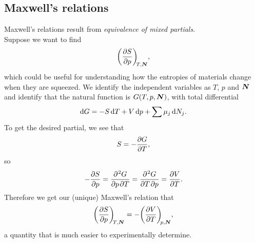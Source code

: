 \subsection{Maxwell's relations}
Maxwell's relations result from \textit{equivalence of mixed partials}. \\
Suppose we want to find 
\begin{equation}
\diffp Sp[T,\bvec{N}],
\end{equation}
which could be useful for understanding how the entropies of materials change when they are squeezed. 
We identify the independent variables as $T$, $p$ and $\boldsymbol{N}$ 
and identify that the natural function is $G(T,p,\boldsymbol{N})$, with total differential
\begin{equation}
\dif G=-S\dif T+V\dif p+\sum\mu_j\dif N_j.
\end{equation}
To get the desired partial, we see that
\begin{equation}
S=-\diffp GT,
\end{equation}
so
\begin{equation}
-\diffp Sp=\diffp{G}{p,T}=\diffp{G}{T,p}=\diffp VT.
\end{equation}
Therefore we get our (unique) Maxwell's relation that
\begin{equation}
\diffp Sp[T,\bvec{N}]=-\diffp VT[p,\bvec{N}],
\end{equation}
a quantity that is much easier to experimentally determine.
